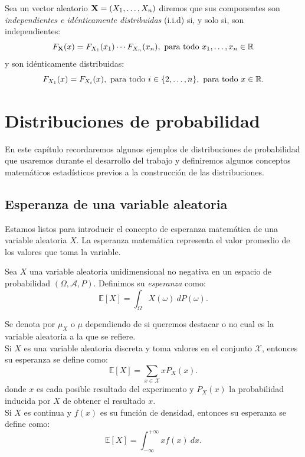 \documentclass[oneside,openright,titlepage,numbers=noenddot,openany,headinclude,footinclude=true,
cleardoublepage=empty,abstractoff,BCOR=5mm,paper=a4,fontsize=12pt,main=spanish]{scrreprt}
\begin{document}
\begin{definition}
Sea un vector aleatorio $\textbf{X}=(X_1,\dots,X_n)$ diremos que sus componentes son \textit{independientes e idénticamente distribuidas} (i.i.d) si, y solo si, son independientes: $$F_{\nm{X}}(x)=F_{X_1}(x_1)\cdots F_{X_n}(x_n), \ \text{para todo} \ x_1,\dots,x_n \in \R$$
y son idénticamente distribuidas: $$F_{X_1}(x)=F_{X_i}(x), \ \text{para todo} \ i \in \{2,\dots,n\}, \ \text{para todo} \ x \in \R.$$
\end{definition}


\chapter{Distribuciones de probabilidad}

En este capítulo recordaremos algunos ejemplos de distribuciones de probabilidad que usaremos durante el desarrollo del trabajo y definiremos algunos conceptos matemáticos estadísticos previos a la construcción de las distribuciones.

\section{Esperanza de una variable aleatoria}

Estamos listos para introducir el concepto de esperanza matemática de una variable aleatoria $X$. La esperanza matemática representa el valor promedio de los valores que toma la variable.\\


\begin{definition}[Esperanza]
Sea $X$ una variable aleatoria unidimensional no negativa en un espacio de probabilidad $(\Omega, \mathcal{A},P)$. Definimos su \textit{esperanza} como: $$\mathbb{E}[X]=\int_{\Omega} X(\omega) \ dP(\omega).$$

Se denota por $\mu_X$ o $\mu$ dependiendo de si queremos destacar o no cual es la variable aleatoria a la que se refiere.\\

Si $X$ es una variable aleatoria discreta y toma valores en el conjunto $\mathcal{X}$, entonces su esperanza se define como: $$\mathbb{E}[X]=\sum_{x\in \mathcal{X}} x P_X(x).$$ donde $x$ es cada posible resultado del experimento y $P_X(x)$ la probabilidad inducida por $X$ de obtener el resultado $x$.\\

Si $X$ es continua y $f(x)$ es su función de densidad, entonces su esperanza se define como: $$\mathbb{E}[X]=\int_{-\infty}^{+\infty}x f(x) \ dx.$$
\end{definition}\
\end{document}
